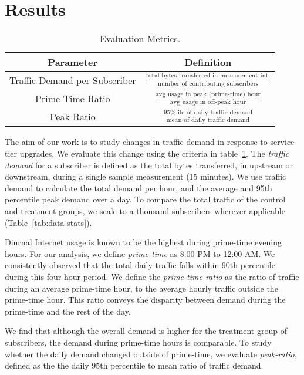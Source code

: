 \section{Results}\label{sec:analysis}

\begin{table}[t]
\begin{small}
\begin{tabular}{| c | c |}\hline
\textbf{Parameter} & \textbf{Definition}	\\\hline
Traffic Demand per Subscriber& \(\frac{\text{total bytes transferred in 
measurement int.}}{\text{number of contributing subscribers}}\)	\\
Prime-Time Ratio 	& \( \frac{ \text{avg usage in peak (prime-time) 
hour}}{ \text{avg usage in off-peak hour}}\) 		\\
Peak Ratio 		& \(\frac{\text{95\%-ile of daily traffic 
demand}}{\text{mean of daily traffic demand}}\)	\\\hline
\end{tabular}
\end{small}
\caption{Evaluation Metrics.}
\label{tab:eval-criteria}
\end{table}

The aim of our work is to study changes in traffic demand in response
to service tier upgrades. We evaluate this
change using the criteria in table~\ref{tab:eval-criteria}. The \emph{traffic 
demand} for a subscriber is defined as the total bytes transferred, in 
upstream or downstream, during a single sample measurement (15 minutes).
We use traffic demand to calculate the total demand per hour, and the average 
and 95th percentile peak demand over a day. To compare the total
traffic of the control and treatment groups, we scale to a thousand subscribers
wherever applicable (Table~\ref{tab:data-stats}).

Diurnal Internet usage is known to be the highest during prime-time evening 
hours. For our analysis, we define \emph{prime time} as 8:00 PM to 12:00 AM.
We consistently observed that the total daily traffic falls within 90th percentile
during this four-hour period. We define the \emph{prime-time ratio} as the
ratio of traffic during an average prime-time hour, to the average
hourly traffic outside the prime-time hour.
This ratio conveys the disparity between demand during the prime-time and
the rest of the day.

We find that although the overall demand is higher for the treatment group of
subscribers, the demand during prime-time hours is comparable. 
To study whether the daily demand changed outside of prime-time, we evaluate 
\emph{peak-ratio}, defined as the the daily 95th percentile to mean ratio of
traffic demand.









%
